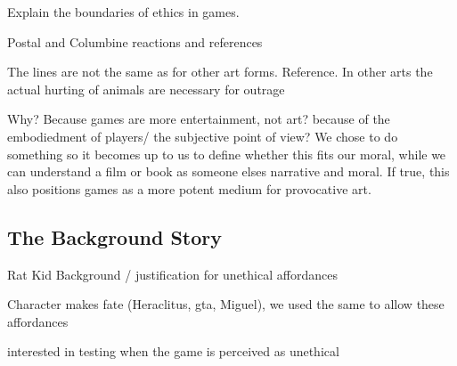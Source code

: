 Explain the boundaries of ethics in games. \

Postal and Columbine reactions and references\

The lines are not the same as for other art forms. Reference. In other arts the actual hurting of animals are necessary for outrage\

Why? Because games are more entertainment, not art? because of the embodiedment of players/ the subjective point of view? We chose to do something so it becomes up to us to define whether this fits our moral, while we can understand a film or book as someone elses narrative and moral. If true, this also positions games as a more potent medium for provocative art. \ 

\subsection{The Background Story}

Rat Kid Background / justification for unethical affordances\

Character makes fate (Heraclitus, gta, Miguel), we used the same to allow these affordances \

interested in testing when the game is perceived as unethical\
